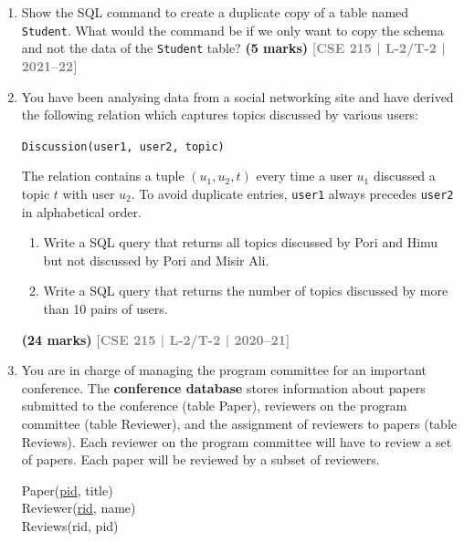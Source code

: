\documentclass[12pt]{article}
\newcommand{\yr}[1]{\hfill\textcolor{gray}{\small\textbf{[#1]}}}
\newcommand{\mk}[1]{\textcolor{orange!70!black}{\small\textbf{(#1 marks)}}}
\begin{document}
\begin{enumerate}
\item Show the SQL command to create a duplicate copy of a table named \texttt{Student}. What would the command be if we only want to copy the schema and not the data of the \texttt{Student} table?
\mk{5} \yr{CSE 215 | L-2/T-2 | 2021--22}


\item You have been analysing data from a social networking site and have derived the following relation which captures topics discussed by various users:
\begin{center}
\texttt{Discussion(user1, user2, topic)}
\end{center}
The relation contains a tuple $(u_1, u_2, t)$ every time a user $u_1$ discussed a topic $t$ with user $u_2$. To avoid duplicate entries, \texttt{user1} always precedes \texttt{user2} in alphabetical order.
\begin{enumerate}
  \item Write a SQL query that returns all topics discussed by Pori and Himu but not discussed by Pori and Misir Ali.
  \item Write a SQL query that returns the number of topics discussed by more than 10 pairs of users.
\end{enumerate}
\mk{24} \yr{CSE 215 | L-2/T-2 | 2020--21}


\item You are in charge of managing the program committee for an important conference. The \textbf{conference database} stores information about papers submitted to the conference (table Paper), reviewers on the program committee (table Reviewer), and the assignment of reviewers to papers (table Reviews). Each reviewer on the program committee will have to review a set of papers. Each paper will be reviewed by a subset of reviewers.

\vspace{0.2cm}
\noindent Paper(\underline{pid}, title) \\
Reviewer(\underline{rid}, name) \\
Reviews(rid, pid)
\vspace{0.2cm}


\end{enumerate}
\end{document}

